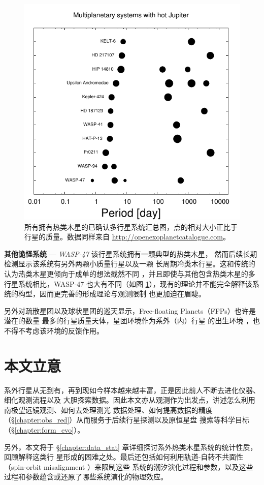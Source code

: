 \begin{figure}[b]
\centering
\includegraphics[width=1.0\textwidth]{figures/chapter1/fig14_hjmul.pdf}
\caption{所有拥有热类木星的已确认多行星系统汇总图，点的相对大小正比于行星的质量。数据同样来自 \url{http://openexoplanetcatalogue.com}。}
\label{fig:hjwcomp}
\end{figure}

\textbf{其他诡怪系统} --- \textit{WASP-47} {}  该行星系统拥有一颗典型的热类木星\cite{Hellier2012}，
然而后续长期检测显示该系统有另外两颗小质量行星\cite{Becker2015,SanchisOjeda2015}以及一颗
长周期冷类木行星\cite{NeveuVanMalle2016}。这和传统的认为热类木星更倾向于成单的想法截然不同
\cite{Steffen2012}，并且即使与其他包含热类木星的多行星系统相比，WASP-47 也大有不同（如图 
\ref{fig:hjwcomp}），现有的理论并不能完全解释该系统的构型，因而更完善的形成理论与观测限制
也更加迫在眉睫。

另外对疏散星团以及球状星团的巡天显示，Free-floating Planets（FFPs）也许是潜在的数量
最多的行星质量天体\cite{Lucas2000,Bihain2009,Sumi2011}，星团环境作为系外（内）行星
的出生环境\cite{Adams2010,Liu2013} ，也不得不考虑该环境的反馈作用。


\section{本文立意}

系外行星从无到有，再到现如今样本越来越丰富，正是因此前人不断去进化仪器、细化观测流程以及
大胆探索数据。因此本文亦从观测作为出发点，讲述怎么利用南极望远镜观测、如何去处理测光
数据处理、如何提高数据的精度（\S \ref{chapter:obs_red}）从而服务于后续行星探测以及原恒星盘
搜索等科学目标（\S \ref{chapter:form_evo}）。

另外，本文将于 \S \ref{chapter:data_stat} 章详细探讨系外热类木星系统的统计性质，回顾解释这类行
星形成的困难之处。最后还包括如何利用轨道-自转不共面性（spin-orbit misalignment ）来限制这些
系统的潮汐演化过程和参数，以及这些过程和参数蕴含或还原了哪些系统演化的物理效应。





